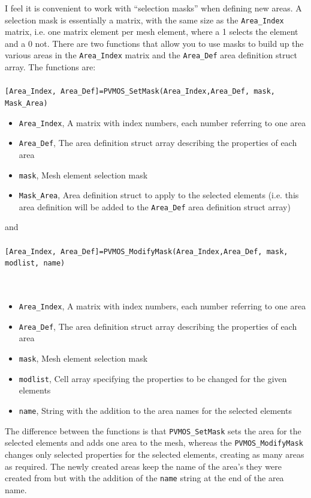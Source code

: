 \documentclass[noshowpacs,preprintnumbers,amsmath,amssymb, letter]{revtex4}
\begin{document}
I feel it is convenient to work with ``selection masks'' when defining new areas. A selection mask is essentially a matrix, with the same size as the \texttt{Area\_Index} matrix, i.e. one matrix element per mesh element, where a 1 selects the element and a 0 not. There are two functions that allow you to use masks to build up the various areas in the \texttt{Area\_Index} matrix and the \texttt{Area\_Def} area definition struct array. The functions are:\\ \\
\texttt{[Area\_Index, Area\_Def]=PVMOS\_SetMask(Area\_Index,Area\_Def, mask, Mask\_Area)}\\
\begin{itemize}
\item{} \texttt{Area\_Index}, A matrix with index numbers, each number referring to one area
\item{} \texttt{Area\_Def}, The area definition struct array describing the properties of each area
\item{} \texttt{mask}, Mesh element selection mask
\item{} \texttt{Mask\_Area}, Area definition struct to apply to the selected elements (i.e. this area definition will be added to the \texttt{Area\_Def} area definition struct array)
\end{itemize}
and \\ \\
\texttt{[Area\_Index, Area\_Def]=PVMOS\_ModifyMask(Area\_Index,Area\_Def, mask, modlist, name)} \\
\\ \\
\begin{itemize}
\item{} \texttt{Area\_Index}, A matrix with index numbers, each number referring to one area
\item{} \texttt{Area\_Def}, The area definition struct array describing the properties of each area
\item{} \texttt{mask}, Mesh element selection mask
\item{} \texttt{modlist}, Cell array specifying the properties to be changed for the given elements
\item{} \texttt{name}, String with the addition to the area names for the selected elements 
\end{itemize}

The difference between the functions is that  \texttt{PVMOS\_SetMask} sets the area for the selected elements and adds one area to the mesh, whereas the \texttt{PVMOS\_ModifyMask} changes only selected properties for the selected elements, creating as many areas as required. The newly created areas keep the name of the area's they were created from but with the addition of the \texttt{name} string at the end of the area name. 
\end{document}
